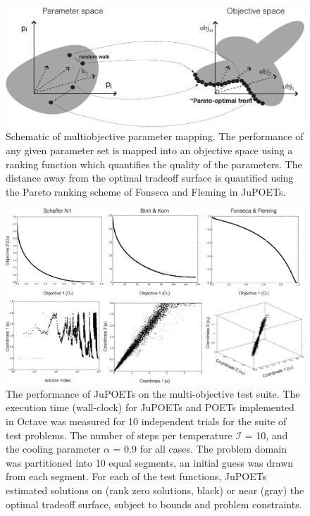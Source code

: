 \documentclass[12pt]{article}
\begin{document}
\begin{figure}[h]
  \centering
  \includegraphics[width=1.0\textwidth]{./figs/Figure-1-Parameter-ObjMapping.pdf}
  \caption{Schematic of multiobjective parameter mapping. The performance of any given parameter set is mapped into an objective space using a ranking function which quantifies the quality of the parameters. The distance away from the optimal tradeoff surface is quantified using the Pareto ranking scheme of Fonseca and Fleming in JuPOETs.}\label{fig:fig-MOSAalgorithm}
\end{figure}

\begin{figure}[h]
  \includegraphics[width=1.0\textwidth]{./figs/Figure-2-ObjectiveDomain-Space.png}
  \caption{The performance of JuPOETs on the multi-objective test suite.
  The execution time (wall-clock) for JuPOETs and POETs implemented in Octave was measured for 10 independent trials for the suite of test problems.
  The number of steps per temperature $\mathcal{I}$ = 10, and the cooling parameter $\alpha$ = 0.9 for all cases.
  The problem domain was partitioned into 10 equal segments, an initial guess was drawn from each segment.
  For each of the test functions, JuPOETs estimated solutions on (rank zero solutions, black) or near (gray) the optimal tradeoff surface, subject to bounds and problem constraints.  }\label{fig:fig-timing}
\end{figure}
\end{document}
